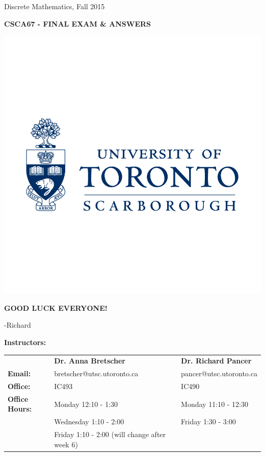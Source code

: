 \documentclass{article}
\begin{document}
\begin{titlepage}
\begin{center}
  \vspace{5cm}

  Discrete Mathematics, Fall 2015

  \hrulefill
  \vspace{0.3cm}

  \textbf{\huge CSCA67 - FINAL EXAM \& ANSWERS}

  \hrulefill

  \vspace{0.5cm}

  \includegraphics[scale = 0.25]{UTSC}

  \textbf{GOOD LUCK EVERYONE!}

  -Richard

  \vspace{4cm}

  \end{center}

  \textbf{Instructors:}

  \begin{center}

  \begin{tabular}{lll}
   &\textbf{Dr. Anna Bretscher}&\textbf{Dr. Richard Pancer}\\
  \textbf{Email:} & bretscher@utsc.utoronto.ca & pancer@utsc.utoronto.ca\\
  \textbf{Office:} & IC493 & IC490\\
  \textbf{Office Hours:}& Monday 12:10 - 1:30 & Monday 11:10 - 12:30\\
   & Wednesday 1:10 - 2:00 & Friday 1:30 - 3:00\\
   & Friday 1:10 - 2:00 (will change after week 6)&
  \end{tabular}

  \end{center}

\end{titlepage}
\pagestyle{fancy}
\end{document}
